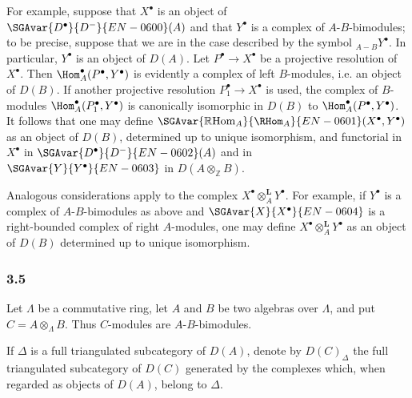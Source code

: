For example, suppose that $X^\bullet$ is an object of $\SGAvar{D^\bullet}{D^-}{EN-0600}(A)$ and that $Y^\bullet$ is a complex of $A$-$B$-bimodules; to be precise, suppose that we are in the case described by the symbol ${}_{A-B}Y^\bullet$. In particular, $Y^\bullet$ is an object of $D(A)$. Let $P^\bullet\to X^\bullet$ be a projective resolution of $X^\bullet$. Then $\Hom_A^\bullet(P^\bullet,Y^\bullet)$ is evidently a complex of left $B$-modules, i.e. an object of $D(B)$. If another projective resolution $P_1^\bullet\to X^\bullet$ is used, the complex of $B$-modules $\Hom_A^\bullet(P_1^\bullet,Y^\bullet)$ is canonically isomorphic in $D(B)$ to $\Hom_A^\bullet(P^\bullet,Y^\bullet)$. It follows that one may define $\SGAvar{\mathbb{R}\mathrm{Hom}_A}{\RHom_A}{EN-0601}(X^\bullet,Y^\bullet)$ as an object of $D(B)$, determined up to unique isomorphism, and functorial in $X^\bullet$ in $\SGAvar{D^\bullet}{D^-}{EN-0602}(A)$ and in $\SGAvar{Y}{Y^\bullet}{EN-0603}$ in $D(A\otimes_{\mathbb Z}B)$.

Analogous considerations apply to the complex $X^\bullet\otimes_A^{\mathbf L}Y^\bullet$. For example, if $Y^\bullet$ is a complex of $A$-$B$-bimodules as above and $\SGAvar{X}{X^\bullet}{EN-0604}$ is a right-bounded complex of right $A$-modules, one may define $X^\bullet\otimes_A^{\mathbf L}Y^\bullet$ as an object of $D(B)$ determined up to unique isomorphism.

\subsubsection*{3.5}

Let $\Lambda$ be a commutative ring, let $A$ and $B$ be two algebras over $\Lambda$, and put $C=A\otimes_\Lambda B$. Thus $C$-modules are $A$-$B$-bimodules.

If $\Delta$ is a full triangulated subcategory of $D(A)$, denote by $D(C)_{\Delta}$ the full triangulated subcategory of $D(C)$ generated by the complexes which, when regarded as objects of $D(A)$, belong to $\Delta$.

